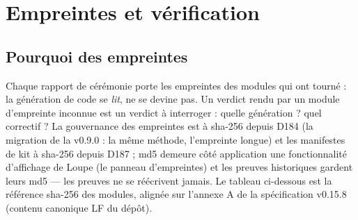 \section{Empreintes et vérification}\label{sec:empreintslivre}

\subsection{Pourquoi des empreintes}

Chaque rapport de cérémonie porte les empreintes des modules qui ont tourné : la
génération de code se \emph{lit}, ne se devine pas. Un verdict rendu par un module
d'empreinte inconnue est un verdict à interroger : quelle génération ? quel correctif
? La gouvernance des empreintes est à sha-256 depuis D184 (la migration de la
v0.9.0 : la même méthode, l'empreinte longue) et les manifestes de kit à sha-256
depuis D187 ; md5 demeure côté application une fonctionnalité d'affichage de
Loupe (le panneau d'empreintes) et les preuves historiques gardent leurs md5 —
les preuves ne se réécrivent jamais. Le tableau ci-dessous est la référence
sha-256 des modules, alignée sur l'annexe A de la spécification v0.15.8
(contenu canonique LF du dépôt).


